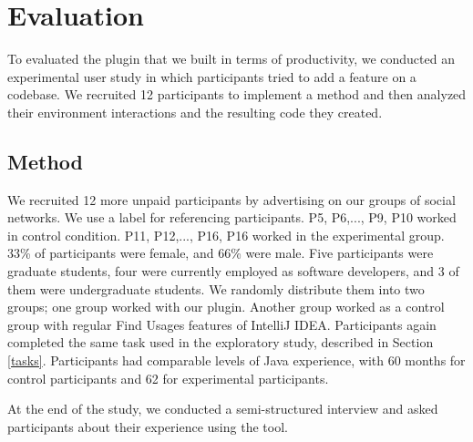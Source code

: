 \documentclass[conference]{IEEEtran}
\begin{document}








\section{Evaluation}
To evaluated the plugin that we built in terms of productivity, we conducted an experimental user study in which participants tried to add a feature on a codebase. We recruited 12 participants to implement a method and then analyzed their environment interactions and the resulting code they created. 

\subsection{Method}

We recruited 12 more unpaid participants by advertising on our groups of social networks. We use a label for referencing participants. P5, P6,..., P9, P10 worked in control condition. P11, P12,..., P16, P16 worked in the experimental group. 33\% of participants were female, and 66\% were male. Five participants were graduate students, four were currently employed as software developers, and 3 of them were undergraduate students. We randomly distribute them into two groups; one group worked with our plugin. Another group worked as a control group with regular Find Usages features of IntelliJ IDEA. Participants again completed the same task used in the exploratory study, described in Section \ref{tasks}. Participants had comparable levels of Java experience, with 60 months for control participants and 62 for experimental participants.\par 
At the end of the study, we conducted a semi-structured interview and asked participants about their experience using the tool.
\end{document}
